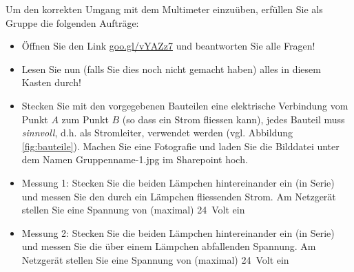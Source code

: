 \documentclass[11pt,twoside=false,open=any]{scrbook}
\begin{document}
\begin{tcolorbox}[breakable,colback=gray!20, title=Auftrag 2: Erste Messungen mit dem Multimeter]
Um den korrekten Umgang mit dem Multimeter einzuüben, erfüllen Sie als Gruppe die folgenden Aufträge:
\begin{itemize}
    \item Öffnen Sie den Link \href{https://goo.gl/vYAZz7}{goo.gl/vYAZz7} und beantworten Sie alle Fragen!
    \item Lesen Sie nun (falls Sie dies noch  nicht gemacht haben) alles in diesem Kasten durch!
    \item Stecken Sie mit den vorgegebenen Bauteilen eine elektrische Verbindung vom Punkt $A$ zum Punkt $B$ (so dass ein Strom fliessen kann), jedes Bauteil muss \textit{sinnvoll}, d.h. als Stromleiter, verwendet werden (vgl. Abbildung \ref{fig:bauteile}). Machen Sie eine Fotografie und laden Sie die Bilddatei unter dem Namen Gruppenname-1.jpg im Sharepoint hoch.
    \item Messung 1: Stecken Sie die beiden Lämpchen hintereinander ein (in Serie) und messen Sie den durch ein Lämpchen fliessenden Strom. Am Netzgerät stellen Sie eine Spannung von (maximal) \SI{24}{Volt} ein
    \item Messung 2: Stecken Sie die beiden Lämpchen hintereinander ein (in Serie) und messen Sie die über einem Lämpchen abfallenden Spannung. Am Netzgerät stellen Sie eine Spannung von (maximal) \SI{24}{Volt} ein
\end{itemize}



\end{tcolorbox}
\end{document}
